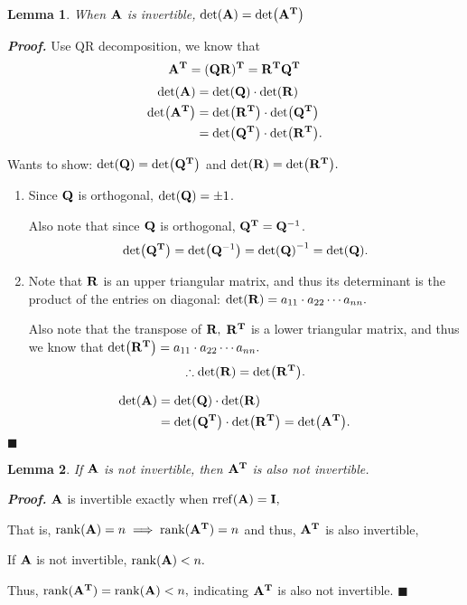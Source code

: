 \documentclass[12pt, a4paper]{article}
\newtheorem{lem}{Lemma}[section]
\newenvironment*{prf}{\par\indent\textbf{\textit{Proof. }}}{\hfill $\blacksquare$\par}
\def\T{{\vb{T}}}
\def\rref{\mathrm{rref}}
\def\rank{\mathrm{rank}}
\def\matrixA{\vb{A}}
\def\matrixI{\vb{I}}
\begin{document}
\begin{lem}
	When $\matrixA$ is invertible, $\det(\matrixA)=\det(\matrixA^\T)$
\end{lem}
\begin{prf}
	Use QR decomposition, we know that \[\matrixA^\T=(\vb Q\vb R)^\T=\vb R^\T\vb Q^\T\] \[\begin{aligned}\det(\matrixA)&=\det(\vb Q)\cdot\det(\vb R)\\\det(\matrixA^\T)&=\det(\vb R^\T)\cdot\det(\vb Q^\T)\\&=\det(\vb Q^\T)\cdot\det(\vb R^\T).\end{aligned}\]\par Wants to show: $\det(\vb Q)=\det(\vb Q^\T)$ and $\det(\vb R)=\det(\vb R^\T).$
	\begin{enumerate}
		\item Since $\vb Q$ is orthogonal, $\det(\vb Q)=\pm 1$.\par Also note that since $\vb Q$ is orthogonal, $\vb Q^\T=\vb Q^{-1}$.\[\det(\vb Q^\T)=\det(\vb Q^{-1})=\det(\vb Q)^{-1}=\det(\vb Q).\]
		\item Note that $\vb R$ is an upper triangular matrix, and thus its determinant is the product of the entries on diagonal: $\det(\vb R)=a_{11}\cdot a_{22}\cdots a_{nn}.$\par Also note that the transpose of $\vb R,$ $\vb R^\T$ is a lower triangular matrix, and thus we know that $\det(\vb R^\T)=a_{11}\cdot a_{22}\cdots a_{nn}.$\[\therefore \det(\vb R)=\det(\vb R^\T).\]
	\end{enumerate}
	\[\begin{aligned}\det(\matrixA)&=\det(\vb Q)\cdot\det(\vb R)\\&=\det(\vb Q^\T)\cdot\det(\vb R^\T)=\det(\matrixA^\T).\end{aligned}\]
\end{prf}
\begin{lem}
	If $\matrixA$ is not invertible, then $\matrixA^\T$ is also not invertible. 
\end{lem}
\begin{prf}
	$\matrixA$ is invertible exactly when $\rref(\matrixA)=\matrixI,$\par That is, $\rank(\matrixA)=n\implies\rank(\matrixA^\T)=n$ and thus, $\matrixA^\T$ is also invertible,\par If $\matrixA$ is not invertible, $\rank(\matrixA)<n.$\par Thus, $\rank(\matrixA^\T)=\rank(\matrixA)<n,$ indicating $\matrixA^\T$ is also not invertible. 
\end{prf}
\end{document}
